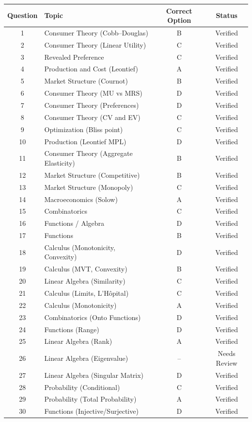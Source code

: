 \documentclass[11pt]{article}
\begin{document}
\begin{center}
\begin{tabular}{c l c c}
\toprule
Question & Topic & Correct Option & Status \\
\midrule
1  & Consumer Theory (Cobb--Douglas)   & B & Verified \\
2  & Consumer Theory (Linear Utility)  & C & Verified \\
3  & Revealed Preference               & C & Verified \\
4  & Production and Cost (Leontief)    & A & Verified \\
5  & Market Structure (Cournot)        & B & Verified \\
6  & Consumer Theory (MU vs MRS)       & D & Verified \\
7  & Consumer Theory (Preferences)     & D & Verified \\
8  & Consumer Theory (CV and EV)       & C & Verified \\
9  & Optimization (Bliss point)        & C & Verified \\
10 & Production (Leontief MPL)         & D & Verified \\
11 & Consumer Theory (Aggregate Elasticity) & B & Verified \\
12 & Market Structure (Competitive)    & B & Verified \\
13 & Market Structure (Monopoly)       & C & Verified \\
14 & Macroeconomics (Solow)            & A & Verified \\
15 & Combinatorics                     & C & Verified \\
16 & Functions / Algebra               & D & Verified \\
17 & Functions                         & B & Verified \\
18 & Calculus (Monotonicity, Convexity)& D & Verified \\
19 & Calculus (MVT, Convexity)         & B & Verified \\
20 & Linear Algebra (Similarity)       & C & Verified \\
21 & Calculus (Limits, L'H\^opital)    & C & Verified \\
22 & Calculus (Monotonicity)           & A & Verified \\
23 & Combinatorics (Onto Functions)    & D & Verified \\
24 & Functions (Range)                 & D & Verified \\
25 & Linear Algebra (Rank)             & A & Verified \\
26 & Linear Algebra (Eigenvalue)       & -- & Needs Review \\
27 & Linear Algebra (Singular Matrix)  & D & Verified \\
28 & Probability (Conditional)         & C & Verified \\
29 & Probability (Total Probability)   & A & Verified \\
30 & Functions (Injective/Surjective)  & D & Verified \\
\bottomrule
\end{tabular}
\end{center}
\end{document}
